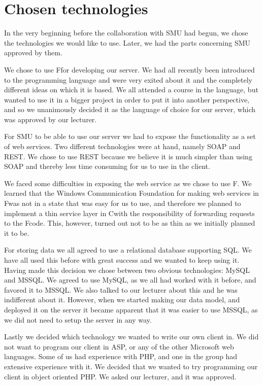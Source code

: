\section{Chosen technologies}
In the very beginning before the collaboration with SMU had begun, we chose the technologies we would like to use. Later, we had the parts concerning SMU approved by them.

We chose to use F\Sh for developing our server. We had all recently been introduced to the programming language and were very exited about it and the completely different ideas on which it is based.
We all attended a course in the language, but wanted to use it in a bigger project in order to put it into another perspective, and so we unanimously decided it as the language of choice for our server, which was approved by our lecturer.

For SMU to be able to use our server we had to expose the functionality as a set of web services. Two different technologies were at hand, namely SOAP and REST.
We chose to use REST because we believe it is much simpler than using SOAP and thereby less time consuming for us to use in the client.

We faced some difficulties in exposing the web service as we chose to use F\Sh.
We learned that the Windows Communication Foundation for making web services in F\Sh was not in a state that was easy for us to use, and therefore we planned to implement a thin service layer in C\Sh with the responsibility of forwarding requests to the F\Sh code. This, however, turned out not to be as thin as we initially planned it to be.

For storing data we all agreed to use a relational database supporting SQL. We have all used this before with great success and we wanted to keep using it.
Having made this decision we chose between two obvious technologies: MySQL and MSSQL. We agreed to use MySQL, as we all had worked with it before, and favored it to MSSQL. We also talked to our lecturer about this and he was indifferent about it. However, when we started making our data model, and deployed it on the server it became apparent that it was easier to use MSSQL, as we did not need to setup the server in any way.

Lastly we decided which technology we wanted to write our own client in. We did not want to program our client in ASP, or any of the other Microsoft web languages. Some of us had experience with PHP, and one in the group had extensive experience with it. We decided that we wanted to try programming our client in object oriented PHP. We asked our lecturer, and it was approved.
\newpage